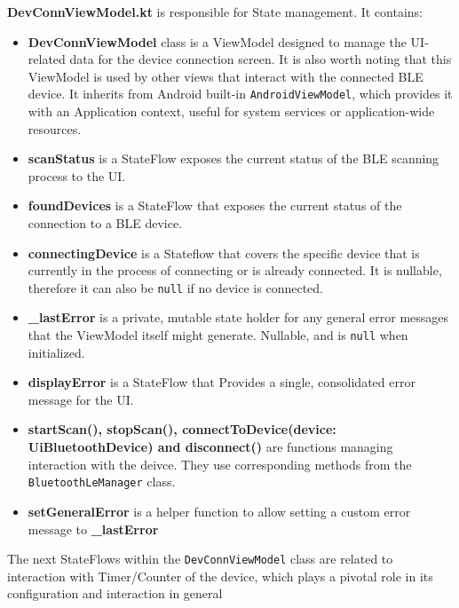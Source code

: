 \textbf{DevConnViewModel.kt} is responsible for State management. It contains:
\begin{itemize}
	\item \textbf{DevConnViewModel} class is a ViewModel designed to manage the UI-related data for the device connection screen. It is also worth noting that this ViewModel is used by other views that interact with the connected \ac{BLE} device. It inherits from Android built-in \texttt{AndroidViewModel}, which provides it with an Application context, useful for system services or application-wide resources.
	\item \textbf{scanStatus} is a StateFlow exposes the current status of the BLE scanning process to the UI.
	\item \textbf{foundDevices} is a StateFlow that exposes the current status of the connection to a BLE device. 
	\item \textbf{connectingDevice} is a Stateflow that covers the specific device that is currently in the process of connecting or is already connected. It is nullable, therefore it can also be \texttt{null} if no device is connected.
	\item \textbf{\_lastError} is a private, mutable state holder for any general error messages that the ViewModel itself might generate. Nullable, and is \texttt{null} when initialized.
	\item  \textbf{displayError} is a StateFlow that Provides a single, consolidated error message for the UI. 
	\item \textbf{startScan(), stopScan(), connectToDevice(device: UiBluetoothDevice) and disconnect()} are functions managing interaction with the deivce. They use corresponding methods from the \texttt{BluetoothLeManager} class.
	\item \textbf{setGeneralError} is a helper function to allow setting a custom error message to \textbf{\_lastError}
\end{itemize}
The next StateFlows within the \texttt{DevConnViewModel} class are related to interaction with Timer/Counter of the device, which plays a pivotal role in its configuration and interaction in general
